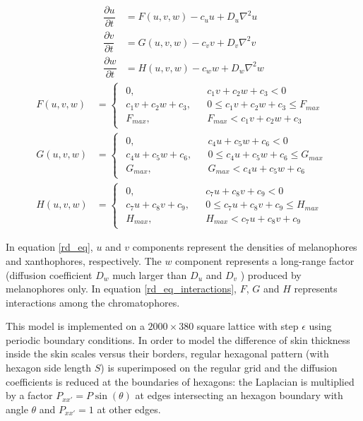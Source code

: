 \documentclass[a4paper]{article}
\begin{document}
\begin{align}
	\dfrac{\partial u}{\partial t} & = F ( u , v , w ) - c_u u + D_u \nabla^2 u \\
	\dfrac{\partial v}{\partial t} & = G ( u , v , w ) - c_v v + D_v \nabla^2 v \\
	\dfrac{\partial w}{\partial t} & = H ( u , v , w ) - c_w w + D_w \nabla^2 w
	\label{rd_eq}
\end{align}
\begin{align}
	F ( u , v , w ) & = \begin{cases} \begin{aligned}
		0, && c_1 v + c_2 w + c_3 < 0 \\
		c_1 v + c_2 w + c_3, && 0 \leq c_1 v + c_2 w + c_3 \leq F_{max} \\
		F_{max}, && F_{max} < c_1 v + c_2 w + c_3
	\end{aligned} \end{cases} \\
	G ( u , v , w ) & = \begin{cases} \begin{aligned}
		0, && c_4 u + c_5 w + c_6 < 0 \\
		c_4 u + c_5 w + c_6, && 0 \leq c_4 u + c_5 w + c_6 \leq G_{max} \\
		G_{max}, && G_{max} < c_4 u + c_5 w + c_6
	\end{aligned} \end{cases} \\
	H ( u , v , w ) & = \begin{cases} \begin{aligned}
		0, && c_7 u + c_8 v + c_9 < 0 \\
		c_7 u + c_8 v + c_9, && 0 \leq c_7 u + c_8 v + c_9 \leq H_{max} \\
		H_{max}, && H_{max} < c_7 u + c_8 v + c_9
	\end{aligned} \end{cases}
	\label{rd_eq_interactions}
\end{align}

In equation \ref{rd_eq}, $u$ and $v$ components represent the densities of melanophores and xanthophores, respectively. The $w$ component represents a long-range factor (diffusion coefficient $D_w$ much larger than $D_u$ and $D_v$ ) produced by melanophores only.
In equation \ref{rd_eq_interactions}, $F$, $G$ and $H$ represents interactions among the chromatophores.

This model is implemented on a $2000 \times 380$ square lattice with step $\epsilon$ using periodic boundary conditions. In order to model the difference of skin thickness inside the skin scales versus their borders, regular hexagonal pattern (with hexagon side length $S$) is superimposed on the regular grid and the diffusion coefficients is reduced at the boundaries of hexagons: the Laplacian is multiplied by a factor $P_{xx'} = P \sin (\theta)$ at edges intersecting an hexagon boundary with angle $\theta$ and $P_{xx'} = 1$ at other edges.
\end{document}
